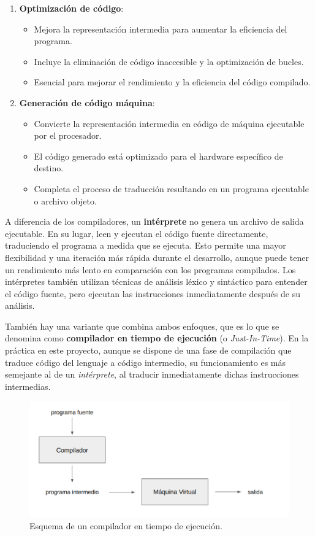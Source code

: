 \begin{enumerate}
    \item \textbf{Optimización de código}:
        \begin{itemize}
            \item Mejora la representación intermedia para aumentar la eficiencia del programa.
            \item Incluye la eliminación de código inaccesible y la optimización de bucles.
            \item Esencial para mejorar el rendimiento y la eficiencia del código compilado.
        \end{itemize}

    \item \textbf{Generación de código máquina}:
        \begin{itemize}
            \item Convierte la representación intermedia en código de máquina ejecutable por el procesador.
            \item El código generado está optimizado para el hardware específico de destino.
            \item Completa el proceso de traducción resultando en un programa ejecutable o archivo objeto.
        \end{itemize}
\end{enumerate}


A diferencia de los compiladores, un \textbf{intérprete} no genera un archivo de salida ejecutable. En su lugar, leen y ejecutan el código fuente directamente, traduciendo el programa a medida que se ejecuta. Esto permite una mayor flexibilidad y una iteración más rápida durante el desarrollo, aunque puede tener un rendimiento más lento en comparación con los programas compilados. Los intérpretes también utilizan técnicas de análisis léxico y sintáctico para entender el código fuente, pero ejecutan las instrucciones inmediatamente después de su análisis.

También hay una variante que combina ambos enfoques, que es lo que se denomina como \textbf{compilador en tiempo de ejecución} (o \textit{Just-In-Time}). En la práctica en este proyecto, aunque se dispone de una fase de compilación que traduce código del lenguaje a código intermedio, su funcionamiento es más semejante al de un \textit{intérprete}, al traducir inmediatamente dichas instrucciones intermedias.

\begin{figure}[h]
    \centering
    \includegraphics[width=1.0\textwidth]{images/pl/jit.png}
    \caption{Esquema de un compilador en tiempo de ejecución.}
    \label{fig:JITCompiler}
\end{figure}